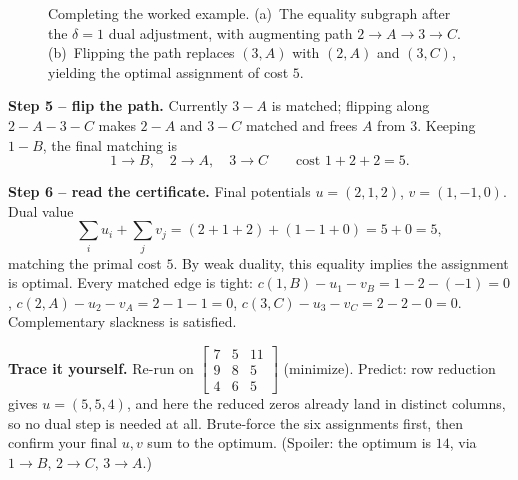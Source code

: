 \begin{figure}[H]
\caption{Completing the worked example. (a)~The equality subgraph after the $\delta=1$ dual adjustment, with augmenting path $2\to A\to 3\to C$. (b)~Flipping the path replaces $(3,A)$ with $(2,A)$ and $(3,C)$, yielding the optimal assignment of cost $5$.}
\label{ch16:fig-worked-augment}
\end{figure}

\textbf{Step 5 -- flip the path.} Currently $3\!-\!A$ is matched; flipping along $2\!-\!A\!-\!3\!-\!C$ makes $2\!-\!A$ and $3\!-\!C$ matched and frees $A$ from $3$. Keeping $1\!-\!B$, the final matching is
\[
\boxed{1\to B,\quad 2\to A,\quad 3\to C}\qquad\text{cost } 1+2+2 = 5.
\]

\textbf{Step 6 -- read the certificate.} Final potentials $u=(2,1,2)$, $v=(1,-1,0)$. Dual value
\[
\sum_i u_i + \sum_j v_j = (2+1+2)+(1-1+0) = 5+0 = 5,
\]
matching the primal cost $5$. By weak duality, this equality implies the assignment is optimal. Every matched edge is tight: $c(1,B)-u_1-v_B = 1-2-(-1)=0$, $c(2,A)-u_2-v_A=2-1-1=0$, $c(3,C)-u_3-v_C=2-2-0=0$. Complementary slackness is satisfied.

\begin{labbox}
\textbf{Trace it yourself.} Re-run on
\(
\left[\begin{smallmatrix} 7&5&11\\ 9&8&5\\ 4&6&5\end{smallmatrix}\right]
\)
(minimize). Predict: row reduction gives $u=(5,5,4)$, and here the reduced zeros already land in distinct columns, so no dual step is needed at all. Brute-force the six assignments first, then confirm your final $u,v$ sum to the optimum. (Spoiler: the optimum is $14$, via $1\!\to\!B,\,2\!\to\!C,\,3\!\to\!A$.)
\end{labbox}

